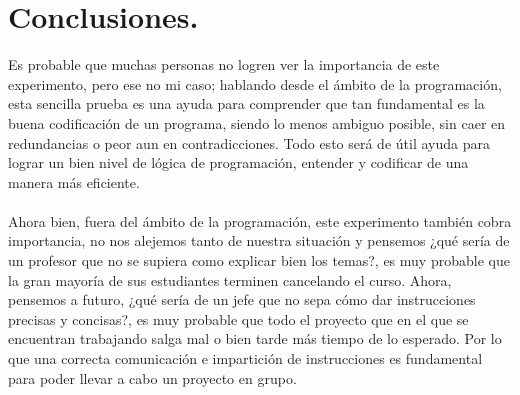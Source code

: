 \documentclass{article}
\begin{document}
\section{Conclusiones.} \label{imagenes}
Es probable que muchas personas no logren ver la importancia de este experimento, pero ese no mi caso; hablando desde el ámbito de la programación, esta sencilla prueba es una ayuda para comprender que tan fundamental es la buena codificación de un programa, siendo lo menos ambiguo posible, sin caer en redundancias o peor aun en contradicciones. Todo esto será de útil ayuda para lograr un bien nivel de lógica de programación, entender y codificar de una manera más eficiente.
\\
\\
Ahora bien, fuera del ámbito de la programación, este experimento también cobra importancia, no nos alejemos tanto de nuestra situación y pensemos ¿qué sería de un profesor que no se supiera como explicar bien los temas?, es muy probable que la gran mayoría de sus estudiantes terminen cancelando el curso. Ahora, pensemos a futuro, ¿qué sería de un jefe que no sepa cómo dar instrucciones precisas y concisas?, es muy probable que todo el proyecto que en el que se encuentran trabajando salga mal o bien tarde más tiempo de lo esperado. Por lo que una correcta comunicación e impartición de instrucciones es fundamental para poder llevar a cabo un proyecto en grupo.



\end{document}
